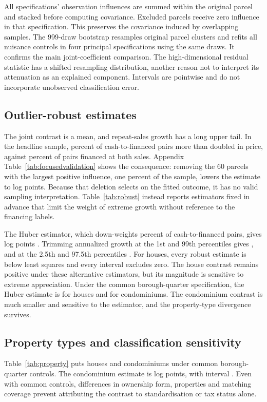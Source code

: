 \documentclass[12pt]{article}
\begin{document}
All specifications' observation influences are summed within the original parcel and stacked before computing covariance. Excluded parcels receive zero influence in that specification. This preserves the covariance induced by overlapping samples. The 999-draw bootstrap resamples original parcel clusters and refits all nuisance controls in four principal specifications using the same draws. It confirms the main joint-coefficient comparison. The high-dimensional residual statistic has a shifted resampling distribution, another reason not to interpret its attenuation as an explained component. Intervals are pointwise and do not incorporate unobserved classification error.

\subsection{Outlier-robust estimates}\label{sec:robust}
The joint contrast is a mean, and repeat-sales growth has a long upper tail. In the headline sample, \TailCF{} percent of cash-to-financed pairs more than doubled in price, against \TailFF{} percent of pairs financed at both sales. Appendix Table~\ref{tab:focusedvalidation} shows the consequence: removing the 60 parcels with the largest positive influence, one percent of the sample, lowers the estimate to \FocusedPositive{} log points. Because that deletion selects on the fitted outcome, it has no valid sampling interpretation. Table~\ref{tab:robust} instead reports estimators fixed in advance that limit the weight of extreme growth without reference to the financing labels.


The Huber estimator, which down-weights \RobustHuberDown{} percent of cash-to-financed pairs, gives \RobustHuber{} log points \RobustHuberCI{}. Trimming annualized growth at the 1st and 99th percentiles gives \RobustTrimOne{}, and at the 2.5th and 97.5th percentiles \RobustTrimTwo{}. For houses, every robust estimate is below least squares and every interval excludes zero. The house contrast remains positive under these alternative estimators, but its magnitude is sensitive to extreme appreciation. Under the common borough-quarter specification, the Huber estimate is \RobustHouseBQHuber{} \RobustHouseBQHuberCI{} for houses and \RobustCondoBQHuber{} \RobustCondoBQHuberCI{} for condominiums. The condominium contrast is much smaller and sensitive to the estimator, and the property-type divergence survives.

\subsection{Property types and classification sensitivity}\label{sec:classsens}
Table~\ref{tab:property} puts houses and condominiums under common borough-quarter controls. The condominium estimate is \CondoGap{} log points, with interval \CondoCI{}. Even with common controls, differences in ownership form, properties and matching coverage prevent attributing the contrast to standardisation or tax status alone.

\end{document}
